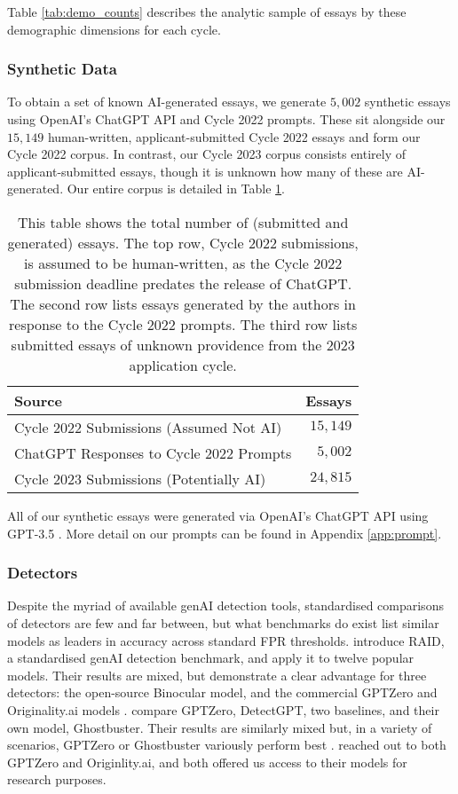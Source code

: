 Table \ref{tab:demo_counts} describes the analytic sample of essays by these demographic dimensions for each cycle. 

\subsubsection{Synthetic Data}\label{sssec:chatgpt}
To obtain a set of known AI-generated essays, we generate $5,002$ synthetic essays using OpenAI's ChatGPT API and Cycle 2022 prompts. These sit alongside our $15,149$ human-written, applicant-submitted Cycle 2022 essays and form our Cycle 2022 corpus. In contrast, our Cycle 2023 corpus consists entirely of applicant-submitted essays, though it is unknown how many of these are AI-generated. Our entire corpus is detailed in Table \ref{tab:cycle_counts}.

\begin{table}[htbp]
  \centering
  \caption{This table shows the total number of (submitted and generated) essays. The top row, Cycle 2022 submissions, is assumed to be human-written, as the Cycle 2022 submission deadline predates the release of ChatGPT. The second row lists essays generated by the authors in response to the Cycle 2022 prompts. The third row lists submitted essays of unknown providence from the 2023 application cycle.}
  \label{tab:cycle_counts}
  \begin{tabular}{ l r }
      \toprule
      Source  & Essays \\
      \midrule
      Cycle 2022 Submissions (Assumed Not AI) & $15,149$ \\
      ChatGPT Responses to Cycle 2022 Prompts & $5,002$ \\
      Cycle 2023 Submissions (Potentially AI) & $24,815$ \\
      \bottomrule
  \end{tabular}
\end{table}

All of our synthetic essays were generated via OpenAI's ChatGPT API using GPT-3.5 \cite{brown_language_2020}. More detail on our prompts can be found in Appendix \ref{app:prompt}.

\subsubsection{Detectors}\label{sssec:detectors}
Despite the myriad of available genAI detection tools, standardised comparisons of detectors are few and far between, but what benchmarks do exist list similar models as leaders in accuracy across standard FPR thresholds. \textcite{dugan_raid_2024} introduce RAID, a standardised genAI detection benchmark, and apply it to twelve popular models. Their results are mixed, but demonstrate a clear advantage for three detectors: the open-source Binocular model, and the commercial GPTZero and Originality.ai models \cite{dugan_raid_2024}. \textcite{verma_ghostbuster_2023} compare GPTZero, DetectGPT, two baselines, and their own model, Ghostbuster. Their results are similarly mixed but, in a variety of scenarios, GPTZero or Ghostbuster variously perform best \cite{verma_ghostbuster_2023} . \rise reached out to both GPTZero and Originlity.ai, and both offered us access to their models for research purposes.

